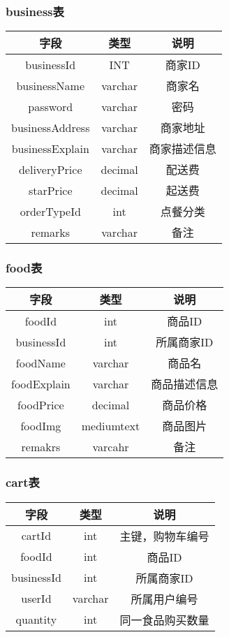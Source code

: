 \subsubsection{business表}
    \begin{tabular}{c|c|c}
        \hline
        字段 & 类型 & 说明 \\
        \hline
        businessId & INT & 商家ID \\
        \hline
        businessName & varchar & 商家名 \\
        \hline
        password & varchar & 密码 \\
        \hline
        businessAddress & varchar & 商家地址 \\
        \hline
        businessExplain & varchar & 商家描述信息 \\
        \hline
        deliveryPrice & decimal & 配送费 \\
        \hline
        starPrice & decimal & 起送费 \\
        \hline
        orderTypeId & int & 点餐分类 \\
        \hline
        remarks & varchar & 备注 \\
    \end{tabular}

\subsubsection{food表}
    \begin{tabular}{c|c|c}
        \hline
        字段 & 类型 & 说明 \\
        \hline
        foodId & int & 商品ID \\
        \hline
        businessId & int & 所属商家ID \\
        \hline
        foodName & varchar & 商品名 \\
        \hline
        foodExplain & varchar & 商品描述信息 \\
        \hline
        foodPrice & decimal & 商品价格 \\
        \hline
        foodImg & mediumtext & 商品图片 \\
        \hline
        remakrs & varcahr & 备注 \\
    \end{tabular}
    
\subsubsection{cart表}
\begin{tabular}{c|c|c}
	\hline
	字段 & 类型 & 说明 \\
	\hline
	cartId & int & 主键，购物车编号 \\
	\hline
	foodId & int & 商品ID \\
	\hline
	businessId & int & 所属商家ID \\
	\hline
	userId & varchar & 所属用户编号 \\
	\hline
	quantity & int & 同一食品购买数量 \\
\end{tabular}


